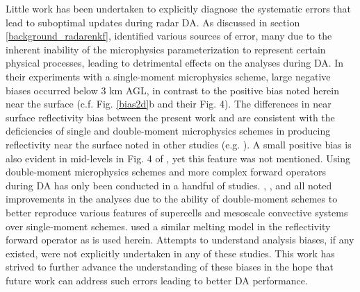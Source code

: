 Little work has been undertaken to explicitly diagnose the systematic errors that lead to suboptimal updates during radar DA. As discussed in section \ref{background_radarenkf}, \citet{dowelletal11} identified various sources of error, many due to the inherent inability of the microphysics parameterization to represent certain physical processes, leading to detrimental effects on the analyses during DA. In their experiments with a single-moment microphysics scheme, large negative biases occurred below 3 km AGL, in contrast to the positive bias noted herein near the surface (c.f. Fig. \ref{bias2d}b and their Fig. 4). The differences in near surface reflectivity bias between the present work and \citet{dowelletal11} are consistent with the deficiencies of single and double-moment microphysics schemes in producing reflectivity near the surface noted in other studies (e.g. \citealt{dawsonetal10,kumjianryzhkov12}). A small positive bias is also evident in mid-levels in Fig. 4 of \citet{dowelletal11}, yet this feature was not mentioned. Using double-moment microphysics schemes and more complex forward operators during DA has only been conducted in a handful of studies. \citet{jungetal12}, \citet{putnametal13}, and \citet{yussoufetal13} all noted improvements in the analyses due to the ability of double-moment schemes to better reproduce various features of supercells and mesoscale convective systems over single-moment schemes. \citet{jungetal12} used a similar melting model in the reflectivity forward operator as is used herein. Attempts to understand analysis biases, if any existed, were not explicitly undertaken in any of these studies. This work has strived to further advance the understanding of these biases in the hope that future work can address such errors leading to better DA performance.

